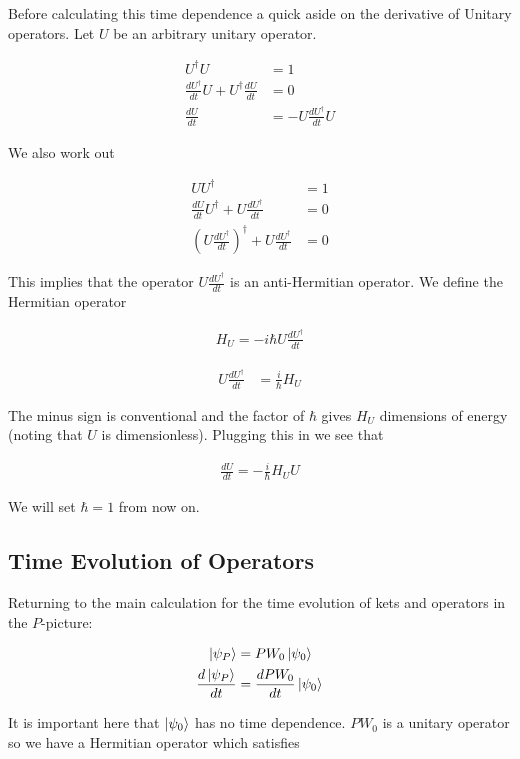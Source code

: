 \documentclass[12pt]{article}
\newcommand{\ddt}[1]{\frac{d #1}{dt}}
\begin{document}
Before calculating this time dependence a quick aside on the derivative of Unitary operators. Let $U$ be an arbitrary unitary operator.

\begin{align}
U^{\dag} U &= 1\\
\ddt{U^{\dag}} U + U^{\dag} \ddt{U} &= 0\\
\ddt{U} &= - U \ddt{U^{\dag}} U
\end{align}

We also work out

\begin{align}
U U^{\dag} &= 1\\
\ddt{U} U^{\dag} + U \ddt{U^{\dag}} &= 0\\
\left(U \ddt{U^{\dag}} \right)^{\dag} + U \ddt{U^{\dag}} &= 0
\end{align}

This implies that the operator $U\ddt{U^{\dag}}$ is an anti-Hermitian operator. We define the Hermitian operator

\begin{align}
\boxed{
H_U = -i\hbar U\ddt{U^{\dag}}
}
\end{align}

\begin{align}
U\ddt{U^{\dag}} &= \frac{i}{\hbar}H_U
\end{align}

The minus sign is conventional and the factor of $\hbar$ gives $H_U$ dimensions of energy (noting that $U$ is dimensionless). 
Plugging this in we see that

\begin{align}
\boxed{\ddt{U} = - \frac{i}{\hbar} H_U U}
\end{align}

We will set $\hbar = 1$ from now on. 

\subsection{Time Evolution of Operators}

Returning to the main calculation for the time evolution of kets and operators in the $P$-picture:

\begin{align}
\ket{\psi_P} &= P W_0\ket{\psi_0}\\
\ddt{\ket{\psi_P}} &= \ddt{P W_0}\ket{\psi_0}\\
\end{align}

It is important here that $\ket{\psi_0}$ has no time dependence. $PW_0$ is a unitary operator so we have a Hermitian operator which satisfies
\end{document}

